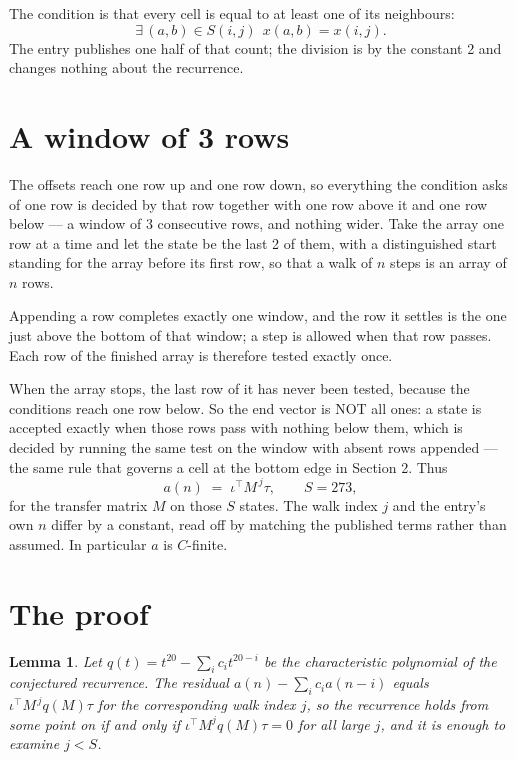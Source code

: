 \documentclass[11pt,a4paper]{article}
\theoremstyle{plain}
\newtheorem{lemma}[theorem]{Lemma}
\theoremstyle{definition}
\begin{document}
The condition is that every cell is equal to at least one of its neighbours:
\[
\exists\,(a,b)\in S(i,j)\ \ x(a,b)=x(i,j).
\]
 The entry publishes one half of that count; the division is by the constant 2 and changes nothing about the recurrence.

\section{A window of 3 rows}

The offsets reach one row up and one row down, so everything the condition asks of one row is
decided by that row together with one row above it and one row below --- a window of
$3$ consecutive rows, and nothing wider. Take the array one row at a time and
let the state be the last 2 of them, with a distinguished start standing for the array before its
first row, so that a walk of $n$ steps is an array of $n$ rows.

Appending a row completes exactly one window, and the row it settles is the one just above the bottom of that window; a step is
allowed when that row passes. Each row of the finished array is therefore tested exactly once.

When the array stops, the last row of it has never been tested, because the
conditions reach one row below. So the end vector is NOT all ones: a state is accepted exactly when
those rows pass with nothing below them, which is decided by running the same test on the window
with absent rows appended --- the same rule that governs a cell at the bottom edge in
Section 2.
Thus
\[
a(n)\;=\;\iota^{\!\top}M^{\,j}\tau ,\qquad S=273,
\]
for the transfer matrix $M$ on those $S$ states. The walk index $j$ and the entry's own $n$
differ by a constant, read off by matching the published terms rather than assumed. In
particular $a$ is $C$-finite.

\section{The proof}

\begin{lemma}\label{lem:crit}
Let $q(t)=t^{20}-\sum_i c_it^{20-i}$ be the characteristic polynomial of the
conjectured recurrence. The residual $a(n)-\sum_ic_ia(n-i)$ equals
$\iota^{\!\top}M^{\,j}q(M)\tau$ for the corresponding walk index $j$, so the recurrence
holds from some point on if and only if $\iota^{\!\top}M^{j}q(M)\tau=0$ for all large $j$,
and it is enough to examine $j<S$.
\end{lemma}
\end{document}
